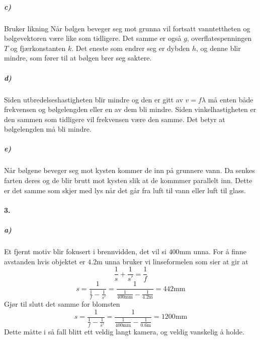 \documentclass[11pt, A4paper,norsk]{article}
\begin{document}
			\subparagraph{c)}
				\begin{flushleft}
Bruker likning Når bølgen beveger seg mot grunna vil fortsatt vanntettheten og bølgevektoren være like som tidligere. Det samme er også $g$, overflatespenningen $T$ og fjærkonstanten $k$. Det eneste som endrer seg er dybden $h$, og denne blir mindre, som fører til at bølgen brer seg saktere.
				\end{flushleft}









			\subparagraph{d)}
				\begin{flushleft}
Siden utbredelseshastigheten blir mindre og den er gitt av $v = f \lambda$ må enten både frekvensen og bølgelengden eller en av dem bli mindre. Siden vinkelhastigheten er den sammen som tidligere vil frekvensen være den samme. Det betyr at bølgelengden må bli mindre.
				\end{flushleft}









			\subparagraph{e)}
				\begin{flushleft}
Når bølgene beveger seg mot kysten kommer de inn på grunnere vann. Da senkes farten deres og de blir brutt mot kysten slik at de kommmer parallelt inn. Dette er det samme som skjer med lys når det går fra luft til vann eller luft til glass.
				\end{flushleft}








		\paragraph{3.}
			\subparagraph{a)}
				\begin{flushleft}
Et fjernt motiv blir fokusert i brennvidden, det vil si $400 \text{mm}$ unna. For å finne avstanden hvis objektet er $4.2 \text{m}$ unna bruker vi linseformelen som sier at gir at
$$\frac{1}{s} + \frac{1}{s'} = \frac{1}{f}$$
$$s = \frac{1}{\frac{1}{f} - \frac{1}{s'}} = \frac{1}{\frac{1}{400 \text{mm}} - \frac{1}{4.2 \text{m}}} = 442 \text{mm}$$
Gjør til slutt det samme for blomsten
$$s = \frac{1}{\frac{1}{f} - \frac{1}{s'}} = \frac{1}{\frac{1}{400 \text{mm}} - \frac{1}{0.6 \text{m}}} = 1200 \text{mm}$$
Dette måtte i så fall blitt ett veldig langt kamera, og veldig vanskelig å holde.
				\end{flushleft}
\end{document}
